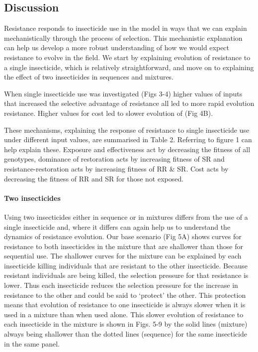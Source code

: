 \documentclass[11pt,]{article}
\let\oldparagraph\paragraph
\renewcommand{\paragraph}[1]{\oldparagraph{#1}\mbox{}}
\begin{document}
\subsection{Discussion}\label{discussion}

Resistance responds to insecticide use in the model in ways that we can
explain mechanistically through the process of selection. This
mechanistic explanation can help us develop a more robust understanding
of how we would expect resistance to evolve in the field. We start by
explaining evolution of resistance to a single insecticide, which is
relatively straightforward, and move on to explaining the effect of two
insecticides in sequences and mixtures.

When single insecticide use was investigated (Figs 3-4) higher values of
inputs that increased the selective advantage of resistance all led to
more rapid evolution resistance. Higher values for cost led to slower
evolution of (Fig 4B).

These mechanisms, explaining the response of resistance to single
insecticide use under different input values, are summarised in Table 2.
Referring to figure 1 can help explain these. Exposure and effectiveness
act by decreasing the fitness of all genotypes, dominance of restoration
acts by increasing fitness of SR and resistance-restoration acts by
increasing fitness of RR \& SR. Cost acts by decreasing the fitness of
RR and SR for those not exposed.

\paragraph{Two insecticides}\label{two-insecticides-1}

Using two insecticides either in sequence or in mixtures differs from
the use of a single insecticide and, where it differs can again help us
to understand the dynamics of resistance evolution. Our base scenario
(Fig 5A) shows curves for resistance to both insecticides in the mixture
that are shallower than those for sequential use. The shallower curves
for the mixture can be explained by each insecticide killing individuals
that are resistant to the other insecticide. Because resistant
individuals are being killed, the selection pressure for that resistance
is lower. Thus each insecticide reduces the selection pressure for the
increase in resistance to the other and could be said to `protect' the
other. This protection means that evolution of resistance to one
insecticide is always slower when it is used in a mixture than when used
alone. This slower evolution of resistance to each insecticide in the
mixture is shown in Figs. 5-9 by the solid lines (mixture) always being
shallower than the dotted lines (sequence) for the same insecticide in
the same panel.
\end{document}
